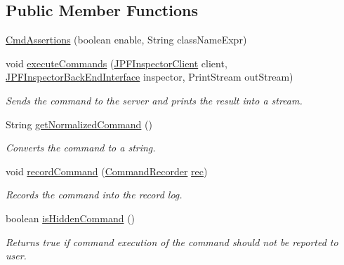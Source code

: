 \subsection*{Public Member Functions}
\begin{DoxyCompactItemize}
\item 
\hyperlink{classgov_1_1nasa_1_1jpf_1_1inspector_1_1client_1_1commands_1_1_cmd_assertions_aa7ea8dd8d5afbd9919c2af956a2fdc9b}{Cmd\+Assertions} (boolean enable, String class\+Name\+Expr)
\item 
void \hyperlink{classgov_1_1nasa_1_1jpf_1_1inspector_1_1client_1_1commands_1_1_cmd_assertions_ab227a434818b6a615fc1b8d4334aa7ca}{execute\+Commands} (\hyperlink{classgov_1_1nasa_1_1jpf_1_1inspector_1_1client_1_1_j_p_f_inspector_client}{J\+P\+F\+Inspector\+Client} client, \hyperlink{interfacegov_1_1nasa_1_1jpf_1_1inspector_1_1interfaces_1_1_j_p_f_inspector_back_end_interface}{J\+P\+F\+Inspector\+Back\+End\+Interface} inspector, Print\+Stream out\+Stream)
\begin{DoxyCompactList}\small\item\em Sends the command to the server and prints the result into a stream. \end{DoxyCompactList}\item 
String \hyperlink{classgov_1_1nasa_1_1jpf_1_1inspector_1_1client_1_1commands_1_1_cmd_assertions_a0c4e56b0f97d1f9c6a76fd89db05f28a}{get\+Normalized\+Command} ()
\begin{DoxyCompactList}\small\item\em Converts the command to a string. \end{DoxyCompactList}\item 
void \hyperlink{classgov_1_1nasa_1_1jpf_1_1inspector_1_1client_1_1_client_command_ae0670332ec750bc5b9016d0b04d8adfe}{record\+Command} (\hyperlink{classgov_1_1nasa_1_1jpf_1_1inspector_1_1client_1_1_command_recorder}{Command\+Recorder} \hyperlink{classgov_1_1nasa_1_1jpf_1_1inspector_1_1client_1_1_client_command_af4246f2427035c72a6af45a2c61361f7}{rec})
\begin{DoxyCompactList}\small\item\em Records the command into the record log. \end{DoxyCompactList}\item 
boolean \hyperlink{classgov_1_1nasa_1_1jpf_1_1inspector_1_1client_1_1_client_command_afb09c400c64e2d8e01059b91ff847761}{is\+Hidden\+Command} ()
\begin{DoxyCompactList}\small\item\em Returns true if command execution of the command should not be reported to user. \end{DoxyCompactList}\end{DoxyCompactItemize}
